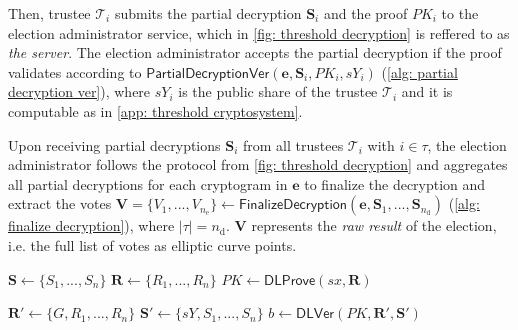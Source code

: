 Then, trustee $\mathcal{T}_i$ submits the partial decryption $\boldsymbol{S}_i$ and the proof $PK_i$ to the election administrator service, which in \cref{fig: threshold decryption} is reffered to as \textit{the server}. The election administrator accepts the partial decryption if the proof validates according to $\mathsf{PartialDecryptionVer}(\boldsymbol{e}, \boldsymbol{S}_i, PK_i, sY_i)$ (\cref{alg: partial decryption ver}), where $sY_i$ is the public share of the trustee $\mathcal{T}_i$ and it is computable as in \cref{app: threshold cryptosystem}.

Upon receiving partial decryptions $\boldsymbol{S}_i$ from all trustees $\mathcal{T}_i$ with $i \in \tau$, the election administrator follows the protocol from \cref{fig: threshold decryption} and aggregates all partial decryptions for each cryptogram in $\boldsymbol{e}$ to finalize the decryption and extract the votes $\boldsymbol{V} = \{ V_1, ..., V_{n_\mathrm{e}} \} \gets \mathsf{FinalizeDecryption} (\boldsymbol{e}, \boldsymbol{S}_1, ..., \boldsymbol{S}_{n_\mathrm{d}})$ (\cref{alg: finalize decryption}), where $|\tau| = n_\mathrm{d}$. $\boldsymbol{V}$ represents the \textit{raw result} of the election, i.e. the full list of votes as elliptic curve points.

\begin{algorithm}[ht]
    \DontPrintSemicolon
    \caption{$\mathsf{PartiallyDecryptAndProve}(\boldsymbol{e}, sx)$}
    \label{alg: partially decrypt and prove}
    
    $\boldsymbol{S} \gets \{S_1, ..., S_n\}$ \;
    $\boldsymbol{R} \gets \{R_1, ..., R_n\}$ \;
    $PK \gets \mathsf{DLProve}(sx, \boldsymbol{R})$ 
     
\end{algorithm}

\begin{algorithm}[ht]
    \DontPrintSemicolon
    \caption{$\mathsf{PartialDecryptionVer}(\boldsymbol{e}, \boldsymbol{S}, PK, sY)$}
    \label{alg: partial decryption ver}
    
    $\boldsymbol{R}' \gets \{G, R_1, ..., R_n\}$ \;
    $\boldsymbol{S}' \gets \{sY, S_1, ..., S_n\}$ \;
    $b \gets \mathsf{DLVer}(PK, \boldsymbol{R}', \boldsymbol{S}')$ 
     
\end{algorithm}

